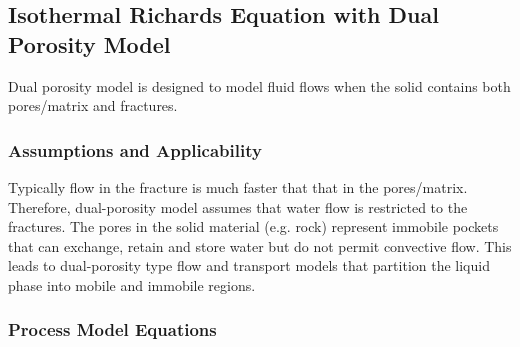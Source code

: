 \clearpage

\subsection{Isothermal Richards Equation with Dual Porosity Model}
\label{sec:dual-porosity-richards-equation}

Dual porosity model is designed to model fluid flows
when the solid contains both pores/matrix and fractures.







\subsubsection{Assumptions and Applicability} 


Typically flow in the fracture is much faster that that in the pores/matrix.
Therefore, 
dual-porosity model assumes that water flow is restricted to the fractures.
The pores in the solid material (e.g. rock) 
represent immobile pockets that can exchange, retain and store water
but do not permit convective flow.
This leads to dual-porosity type flow and transport models that partition the liquid
phase into mobile and immobile regions.


\subsubsection{Process Model Equations} 

